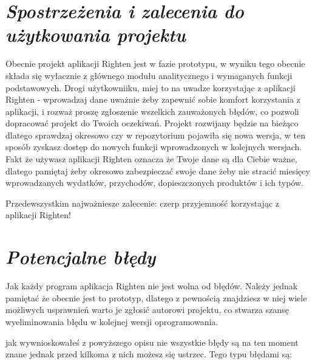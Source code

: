 \documentclass[a4paper,10pt, twoside]{report}
\newcommand{\customstylesection}[1]{\textbf{\textit{#1}}}
\begin{document}
\section{\customstylesection{Spostrzeżenia i zalecenia do użytkowania projektu}}
{Obecnie projekt aplikacji Righten jest w fazie prototypu, w wyniku tego 
obecnie składa się wyłacznie z głównego modułu analitycznego i wymaganych 
funkcji podstawowych. Drogi użytkowniiku, miej to na uwadze korzystając z 
aplikacji Righten - wprowadzaj dane uważnie żeby zapewnić sobie komfort 
korzystania z aplikacji, i rozważ proszę zgłoszenie wszelkich zauważonych 
błędów, co pozwoli dopracować projekt do Twoich oczekiwań. Projekt rozwijany 
będzie na bieżąco dlatego sprawdzaj okresowo czy w repozytorium pojawiła się 
nowa wersja, w ten sposób zyskasz dostęp do nowych funkcji wprowadzonych w 
kolejnych wersjach. Fakt że używasz aplikacji Righten oznacza że Twoje dane są 
dla Ciebie ważne, dlatego pamiętaj żeby okresowo zabezpieczać swoje dane żeby 
nie stracić miesięcy wprowadzanych wydatków, przychodów, dopieszczonych 
produktów i ich typów.}

{Przedewszystkim najważniesze zalecenie: czerp przyjemność korzystając z 
aplikacji Righten!}

\section{\customstylesection{Potencjalne błędy}}
{Jak każdy program aplikacja Righten nie jest wolna od błędów. Należy jednak 
pamiętać że obecnie jest to prototyp, dlatego z pewnością znajdziesz w niej 
wiele możliwych usprawnień warto je zgłosić autorowi projektu, co stwarza szansę
 wyeliminowania błędu w kolejnej wersji oprogramowania.}

{jak wywnioskowałeś z powyższego opisu nie wszystkie błędy są na ten moment 
znane jednak przed kilkoma z nich możesz się ustrzec. Tego typu błędami są:}
\end{document}
